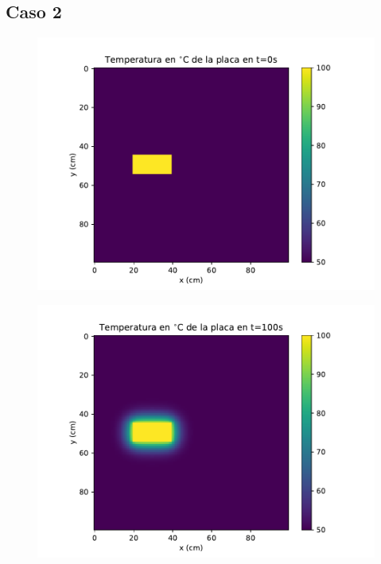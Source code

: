 \documentclass[12pt,letterpaper]{article}
\begin{document}
\subsection*{Caso 2}

\begin{figure}[H]
\includegraphics{f2_0.pdf}
\centering
\end{figure}

\begin{figure}[H]
\includegraphics{f2_100.pdf}
\centering
\end{figure}
\end{document}

